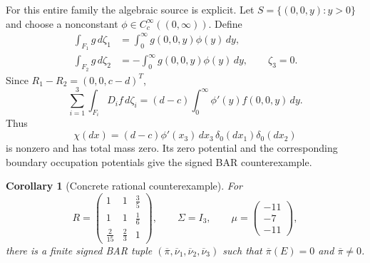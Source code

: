 \documentclass[aihp]{imsart}
\numberwithin{equation}{section}
\theoremstyle{plain}
\newtheorem{corollary}[corollary]{Corollary}
\theoremstyle{definition}
\newcommand{\1}{\mathbf 1}
\begin{document}
For this entire family the algebraic source is explicit. Let $S=\{(0,0,y):y>0\}$ and choose a nonconstant $\phi\in C_c^\infty((0,\infty))$. Define
\begin{align}
 \int_{F_1}g\,d\zeta_1
 &=\int_0^\infty g(0,0,y)\phi(y)\,dy,
                                                    \label{eq:ce-family-zeta1}\\
 \int_{F_2}g\,d\zeta_2
 &=-\int_0^\infty g(0,0,y)\phi(y)\,dy,
 \qquad \zeta_3=0.                         \label{eq:ce-family-zeta2}
\end{align}
Since $R_1-R_2=(0,0,c-d)^T$,
\begin{equation}\label{eq:ce-family-source}
 \sum_{i=1}^3\int_{F_i}D_i f\,d\zeta_i
 =(d-c)\int_0^\infty\phi'(y)f(0,0,y)\,dy.
\end{equation}
Thus
\begin{equation}\label{eq:ce-family-chi}
 \chi(dx)=(d-c)\phi'(x_3)\,dx_3\,
          \delta_0(dx_1)\delta_0(dx_2)
\end{equation}
is nonzero and has total mass zero. Its zero potential and the corresponding boundary occupation potentials give the signed BAR counterexample.

\begin{corollary}[Concrete rational counterexample]\label{cor:rational-counterexample}
For
\begin{equation}\label{eq:ce-explicit-data}
R=
\begin{pmatrix}
1&1&\frac35\\
1&1&\frac16\\
\frac2{15}&\frac23&1
\end{pmatrix},
\qquad
\Sigma=I_3,
\qquad
\mu=\begin{pmatrix}-11\\-7\\-11\end{pmatrix},
\end{equation}
there is a finite signed BAR tuple $(\overline\pi,\overline\nu_1,\overline\nu_2,\overline\nu_3)$ such that $\overline\pi(E)=0$ and $\overline\pi\ne0$.
\end{corollary}
\end{document}

